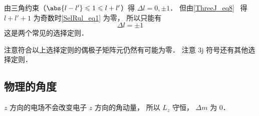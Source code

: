 由三角约束（$\abs{l-l'} \leqslant 1 \leqslant l + l'$）得 $\Delta l = 0, \pm 1$． 但由\autoref{ThreeJ_eq8}~ 得 $l + l' + 1$ 为奇数时\autoref{SelRul_eq1} 为零， 所以只能有
\begin{equation}
 \Delta l = \pm 1
\end{equation}
这是两个常见的选择定则．

注意符合以上选择定则的偶极子矩阵元仍然有可能为零． 注意 3j 符号还有其他选择定则．

\subsection{物理的角度}
$z$ 方向的电场不会改变电子 $z$ 方向的角动量， 所以 $L_z$ 守恒， $\Delta m$ 为 0．
